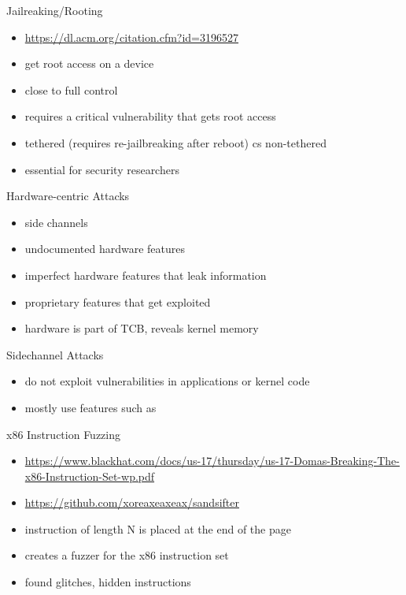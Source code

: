 \documentclass{curs}
\begin{document}
\begin{frame}{Jailreaking/Rooting}
  \begin{itemize}
    \pause \item \url{https://dl.acm.org/citation.cfm?id=3196527}
    \pause \item get root access on a device
    \pause \item close to full control
    \pause \item requires a critical vulnerability that gets root access
    \pause \item tethered (requires re-jailbreaking after reboot) cs non-tethered
    \pause \item essential for security researchers
  \end{itemize}
\end{frame}

\begin{frame}{Hardware-centric Attacks}
  \begin{itemize}
    \pause \item side channels
    \pause \item undocumented hardware features
    \pause \item imperfect hardware features that leak information
    \pause \item proprietary features that get exploited
    \pause \item hardware is part of TCB, reveals kernel memory
  \end{itemize}
\end{frame}

\begin{frame}{Sidechannel Attacks}
  \begin{itemize}
    \pause \item do not exploit vulnerabilities in applications or kernel code
    \pause \item mostly use features such as 
  \end{itemize}
\end{frame}

\begin{frame}{x86 Instruction Fuzzing}
  \begin{itemize}
    \pause \item \url{https://www.blackhat.com/docs/us-17/thursday/us-17-Domas-Breaking-The-x86-Instruction-Set-wp.pdf}
    \pause \item \url{https://github.com/xoreaxeaxeax/sandsifter}
    \pause \item instruction of length N is placed at the end of the page
    \pause \item creates a fuzzer for the x86 instruction set
    \pause \item found glitches, hidden instructions
  \end{itemize}
\end{frame}
\end{document}
